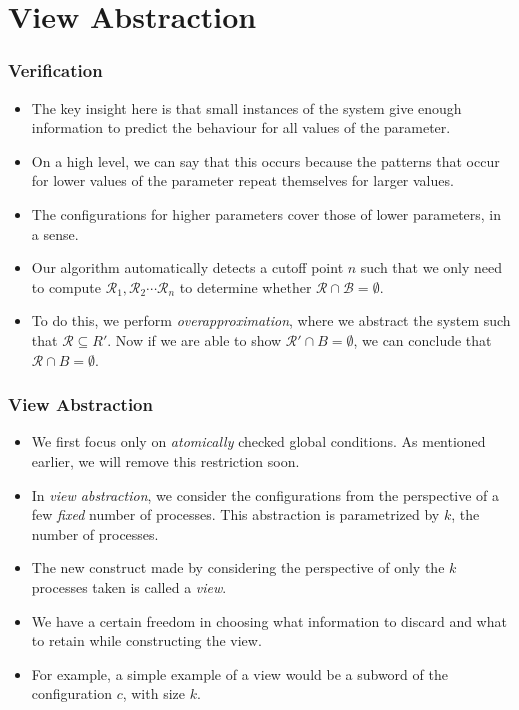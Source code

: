 \documentclass{beamer}
\begin{document}
    \section{View Abstraction}
    {
        \begin{frame}
            \frametitle{Verification}
            \begin{itemize}
                \item The key insight here is that small instances of the system give enough information to predict the behaviour for all values of 
                the parameter.
                \item On a high level, we can say that this occurs because the patterns that occur for lower values of the parameter repeat themselves for larger values.
                \item The configurations for higher parameters cover those of lower parameters, in a sense.
                \item Our algorithm automatically detects a cutoff point $n$ such that we only need to compute $\mathcal{R}_{1}, \mathcal{R}_{2} \cdots \mathcal{R}_{n}$ to determine whether $\mathcal{R} \cap \mathcal{B} = \emptyset$. 
                \item To do this, we perform \textit{overapproximation}, where we abstract the system such that $\mathcal{R} \subseteq R'$. Now if we are able to show $\mathcal{R}' \cap B = \emptyset$, we can conclude that $\mathcal{R} \cap B = \emptyset$.
            \end{itemize}
        \end{frame}

        \begin{frame}
            \frametitle{View Abstraction}
            \begin{itemize}
                \item We first focus only on \textit{atomically} checked global conditions. As mentioned earlier, we will remove this restriction soon.
                \item In \textit{view abstraction}, we consider the configurations from the perspective of a few \textit{fixed} number of processes. This abstraction is parametrized by $k$, the number of processes.
                \item The new construct made by considering the perspective of only the $k$ processes taken is called a \textit{view}.
                \item We have a certain freedom in choosing what information to discard and what to retain while constructing the view.
                \item For example, a simple example of a view would be a subword of the configuration $c$, with size $k$.
            \end{itemize}
        \end{frame}

}
\end{document}
